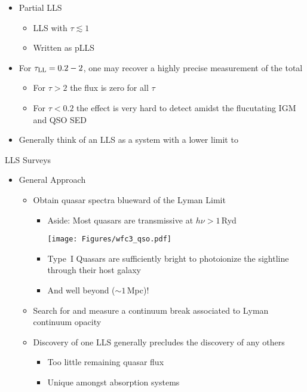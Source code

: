 \documentclass[12pt,letterpaper]{article}
\begin{document}
\begin{Aenumerate}
\begin{itemize}
\begin{itemize}
  	\end{itemize}
  \item Partial LLS
  	\begin{itemize}
  	\item LLS with $\tau \lesssim 1$
  	\item Written as pLLS
  	\end{itemize}
  \item For $\tau_{\rm LL} = 0.2 - 2$, one may recover a highly
  precise measurement of the total \nhi
  	\begin{itemize}
  	\item For $\tau > 2$ the flux is zero for all $\tau$
  	\item For $\tau < 0.2$ the effect is very hard to detect amidst
  	the flucutating IGM and QSO SED
  	\end{itemize}
  \item Generally think of an LLS as a system with a lower limit to \nhi
  \end{itemize}

{\bf \item LLS Surveys}
  \begin{itemize}
  \item General Approach
  	\begin{itemize}
  	\item Obtain quasar spectra blueward of the Lyman Limit
  		\begin{itemize}
  		\item Aside: Most quasars are transmissive at $h\nu > 1$\,Ryd

	\texttt{[image: Figures/wfc3\_qso.pdf]}

  		\item Type~I Quasars are sufficiently bright to photoionize
  		the sightline through their host galaxy
  		\item And well beyond ($\sim 1$\,Mpc)!

  		\end{itemize}
  	\item Search for and measure a continuum break associated to
  	Lyman continuum opacity
  	\item Discovery of one LLS generally precludes the discovery
  	of any others 
  		\begin{itemize}
  		\item Too little remaining quasar flux
  		\item Unique amongst absorption systems
  		\end{itemize}
  	\end{itemize}


\end{itemize}
\end{Aenumerate}
\end{document}

